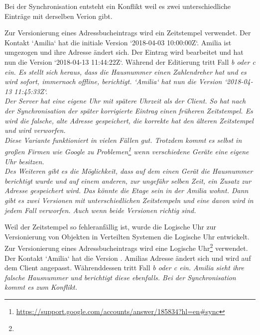 \begin{description}[leftmargin=0.5cm,style=nextline]
    Bei der Synchronisation entsteht ein Konflikt weil es zwei unterschiedliche Einträge mit derselben Verion gibt.\\
  \item[Szenario V1  -- Zeitstempel:]
    Zur Versionierung eines Adressbucheintrags wird ein Zeitstempel verwendet. Der Kontakt `Amilia` hat die initiale Version `2018-04-03 10:00:00Z`.
    Amilia ist umgezogen und ihre Adresse ändert sich. Der Eintrag wird bearbeitet und hat nun die Version `2018-04-13 11:44:22Z`.
    Während der Editierung tritt Fall \it{b} oder \it{c} ein.
    Es stellt sich heraus, dass die Hausnummer einen Zahlendreher hat und es wird sofort, immernoch offline, berichtigt. `Amilia` hat nun die Version `2018-04-13 11:45:33Z`.\\
    Der Server hat eine eigene Uhr mit spätere Uhrzeit als der Client.
    So hat nach der Synchronisation der später korrigierte Eintrag einen früheren Zeitstempel.
    Es wird die falsche, alte Adresse gespeichert, die korrekte hat den älteren Zeitstempel und wird verworfen.\\
    Diese Variante funktioniert in vielen Fällen gut. Trotzdem kommt es selbst in großen Firmen wie Google zu Problemen\footnote{\url{https://support.google.com/accounts/answer/185834?hl=en\#sync}} wenn verschiedene Geräte eine eigene Uhr besitzen.\\
    Des Weiteren gibt es die Möglichkeit, dass auf dem einen Gerät die Hausnummer berichtigt wurde und auf einem anderen, zur ungefähr selben Zeit, ein Zusatz zur Adresse gespeichert wird. Das könnte die Etage sein in der Amilia wohnt. Dann gibt es zwei Versionen mit unterschiedlichen Zeitstempeln und eine davon wird in jedem Fall verworfen. Auch wenn beide Versionen richtig sind.\\
  \item[Szenario V2 -- Logische Uhr:]
    Weil der Zeitstempel so fehleranfällig ist, wurde die Logische Uhr zur Versionierung von Objekten in Verteilten Systemen die Logische Uhr entwickelt.\\
    Zur Versionierung eines Adressbucheintrags wird eine Logische Uhr\footnote{\logicalclock} verwendet. Der Kontakt `Amilia` hat die Version .
    Amilias Adresse ändert sich und wird auf dem Client angepasst.
    Währenddessen tritt Fall \it{b} oder \it{c} ein.
    Amilia sieht ihre falsche Hausnummer und berichtigt diese ebenfalls.
    Bei der Synchronisation kommt es zum Konflikt. \\

\end{description}
